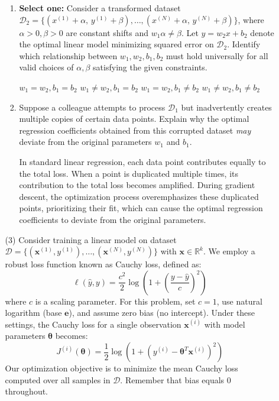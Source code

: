 \documentclass[11pt,addpoints,answers]{exam}
\newcommand{\Dc}{\mathcal{D}}
\newcounter{subq}        %
\renewcommand{\thesubq}{(\alph{subq})}  %
\newenvironment{subquestions}{
	\setcounter{subq}{0}%
	\begin{enumerate}[
		label=\thesubq,
		leftmargin=*,
		align=left,
		itemsep=6pt
		]
	}{
	\end{enumerate}
}
\newcommand{\subquestion}{\refstepcounter{subq}\item}  %
\newcommand{\sone}{\textbf{Select one: }}
\begin{document}
\begin{enumerate}
\begin{enumerate}[label=\alph*), itemsep=10pt]
			\begin{subquestions}
				\subquestion \sone Consider a transformed dataset
				$\Dc_2 = \{(x^{(1)} + \alpha,\, y^{(1)} + \beta), \ldots, (x^{(N)} + \alpha,\, y^{(N)} + \beta)\}$, where $\alpha > 0, \beta > 0$ are constant shifts and $w_1 \alpha \neq \beta$. Let $y = w_2 x + b_2$ denote the optimal linear model minimizing squared error on $\Dc_2$. Identify which relationship between $w_1, w_2, b_1, b_2$ must hold universally for all valid choices of $\alpha, \beta$ satisfying the given constraints.
				
				\checkboxchar{$\Box$} \checkedchar{$\blacksquare$}
				\begin{checkboxes}
					\choice $w_1 = w_2, b_1 = b_2$
					\choice $w_1 \neq w_2, b_1 = b_2$
					\CorrectChoice $w_1 = w_2, b_1 \neq b_2$
					\choice $w_1 \neq w_2, b_1 \neq b_2$
				\end{checkboxes}
				
				\subquestion Suppose a colleague attempts to process $\Dc_1$ but inadvertently creates multiple copies of certain data points. Explain why the optimal regression coefficients obtained from this corrupted dataset \textit{may} deviate from the original parameters $w_1$ and $b_1$.
				
				\begin{answer_box}[title=Your answer:,height=4cm,width=15cm]
					In standard linear regression, each data point contributes equally to the total loss. When a point is duplicated multiple times, its contribution to the total loss becomes amplified. During gradient descent, the optimization process overemphasizes these duplicated points, prioritizing their fit, which can cause the optimal regression coefficients to deviate from the original parameters.
				\end{answer_box}
			\end{subquestions}
			
			
			\item[(3)] Consider training a linear model on dataset $\Dc = \{(\bm{x}^{(1)}, y^{(1)}), \ldots, (\bm{x}^{(N)}, y^{(N)})\}$ with $\bm{x} \in \mathbb{R}^k$. We employ a robust loss function known as Cauchy loss, defined as:
			\[
			\ell(\hat y, y) = \frac{c^2}{2}\log\left(1 + \left(\frac{y - \hat{y}}{c}\right)^2\right)
			\]
			where $c$ is a scaling parameter. For this problem, set $c=1$, use natural logarithm (base $\textbf{e}$), and assume zero bias (no intercept). Under these settings, the Cauchy loss for a single observation $\bm{x}^{(i)}$ with model parameters $\bm\theta$ becomes:
			\[
			J^{(i)}(\bm\theta) = \frac{1}{2}\log\left(1 + \left(y^{(i)} - \bm\theta^T\bm{x}^{(i)}\right)^2\right) 
			\] Our optimization objective is to minimize the mean Cauchy loss computed over all samples in $\Dc$. Remember that bias equals $0$ throughout.
			

\end{enumerate}
\end{enumerate}
\end{document}
